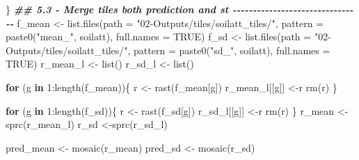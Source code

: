 \documentclass[
  10pt,
  b5paper,
  oneside]{book}
\newenvironment{Shaded}{\begin{snugshade}}{\end{snugshade}}
\newcommand{\AttributeTok}[1]{\textcolor[rgb]{0.77,0.63,0.00}{#1}}
\newcommand{\ConstantTok}[1]{\textcolor[rgb]{0.00,0.00,0.00}{#1}}
\newcommand{\ControlFlowTok}[1]{\textcolor[rgb]{0.13,0.29,0.53}{\textbf{#1}}}
\newcommand{\DecValTok}[1]{\textcolor[rgb]{0.00,0.00,0.81}{#1}}
\newcommand{\DocumentationTok}[1]{\textcolor[rgb]{0.56,0.35,0.01}{\textbf{\textit{#1}}}}
\newcommand{\FunctionTok}[1]{\textcolor[rgb]{0.00,0.00,0.00}{#1}}
\newcommand{\NormalTok}[1]{#1}
\newcommand{\OtherTok}[1]{\textcolor[rgb]{0.56,0.35,0.01}{#1}}
\newcommand{\SpecialCharTok}[1]{\textcolor[rgb]{0.00,0.00,0.00}{#1}}
\newcommand{\StringTok}[1]{\textcolor[rgb]{0.31,0.60,0.02}{#1}}
\begin{document}
\begin{Shaded}
\begin{Highlighting}[]
\NormalTok{  \}}
  \DocumentationTok{\#\# 5.3 {-} Merge tiles both prediction and st {-}{-}{-}{-}{-}{-}{-}{-}{-}{-}{-}{-}{-}{-}{-}{-}{-}{-}{-}{-}{-}{-}{-}{-}{-}{-}{-}{-}{-}{-}{-}{-}}
\NormalTok{  f\_mean }\OtherTok{\textless{}{-}} \FunctionTok{list.files}\NormalTok{(}\AttributeTok{path =} \StringTok{"02{-}Outputs/tiles/soilatt\_tiles/"}\NormalTok{, }
                     \AttributeTok{pattern =} \FunctionTok{paste0}\NormalTok{(}\StringTok{"mean\_"}\NormalTok{, soilatt), }\AttributeTok{full.names =} \ConstantTok{TRUE}\NormalTok{)}
\NormalTok{  f\_sd }\OtherTok{\textless{}{-}} \FunctionTok{list.files}\NormalTok{(}\AttributeTok{path =} \StringTok{"02{-}Outputs/tiles/soilatt\_tiles/"}\NormalTok{, }
                     \AttributeTok{pattern =}  \FunctionTok{paste0}\NormalTok{(}\StringTok{"sd\_"}\NormalTok{, soilatt), }\AttributeTok{full.names =} \ConstantTok{TRUE}\NormalTok{)}
\NormalTok{  r\_mean\_l }\OtherTok{\textless{}{-}} \FunctionTok{list}\NormalTok{()}
\NormalTok{  r\_sd\_l }\OtherTok{\textless{}{-}} \FunctionTok{list}\NormalTok{()}
  
  \ControlFlowTok{for}\NormalTok{ (g }\ControlFlowTok{in} \DecValTok{1}\SpecialCharTok{:}\FunctionTok{length}\NormalTok{(f\_mean))\{}
\NormalTok{    r }\OtherTok{\textless{}{-}} \FunctionTok{rast}\NormalTok{(f\_mean[g])}
\NormalTok{    r\_mean\_l[[g]] }\OtherTok{\textless{}{-}}\NormalTok{r}
    \FunctionTok{rm}\NormalTok{(r)}
\NormalTok{  \}}

  \ControlFlowTok{for}\NormalTok{ (g }\ControlFlowTok{in} \DecValTok{1}\SpecialCharTok{:}\FunctionTok{length}\NormalTok{(f\_sd))\{}
\NormalTok{    r }\OtherTok{\textless{}{-}} \FunctionTok{rast}\NormalTok{(f\_sd[g])}
\NormalTok{    r\_sd\_l[[g]] }\OtherTok{\textless{}{-}}\NormalTok{r}
    \FunctionTok{rm}\NormalTok{(r)}
\NormalTok{  \}}
\NormalTok{  r\_mean }\OtherTok{\textless{}{-}}\FunctionTok{sprc}\NormalTok{(r\_mean\_l)}
\NormalTok{  r\_sd }\OtherTok{\textless{}{-}}\FunctionTok{sprc}\NormalTok{(r\_sd\_l)}
  
\NormalTok{  pred\_mean }\OtherTok{\textless{}{-}} \FunctionTok{mosaic}\NormalTok{(r\_mean)}
\NormalTok{  pred\_sd }\OtherTok{\textless{}{-}} \FunctionTok{mosaic}\NormalTok{(r\_sd)}
  

\end{Highlighting}
\end{Shaded}
\end{document}
